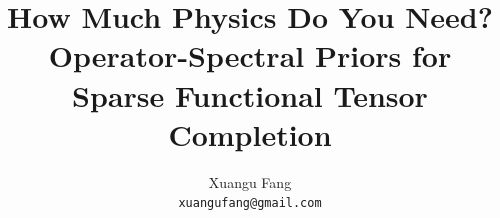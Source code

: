 \documentclass[10pt]{article}
\title{How Much Physics Do You Need?\\
  Operator-Spectral Priors for Sparse Functional Tensor Completion}
\author{%
  Xuangu Fang\\
  \texttt{xuangufang@gmail.com}
}
\date{}
\begin{document}
\maketitle

\begin{abstract}

\end{abstract}













\clearpage
\appendix




\end{document}
